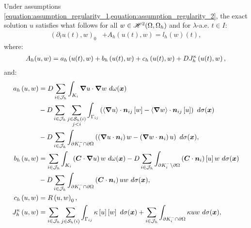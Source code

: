 Under assumptions \cref{equation:assumption_regularity_1,equation:assumption_regularity_2}, the exact solution $u$ satisfies what follows for all $w \in \mathscr{H}^{2}(\Omega, \Omega_h)$ and for $\lambda$-a.e. $t \in I$:
\begin{align}
    \left( \partial_t u(t), w \right)_0 &+ A_h(u(t), w) = l_h \left( w \right) (t),
\end{align}
where:
\begin{align}
    A_h(u, w) = a_h \left( u(t), w \right) + b_h \left( u(t), w \right) + c_h \left( u(t), w \right) + D J^{\kappa}_h \left( u(t), w \right) \label{equation:cdr_Ah},
\end{align}
and:
\begin{align}
    a_h \left( u, w \right) &= \Diffusion \sum_{i \in \SpaceIndices} \int_{K_i} \Gradient u \cdot \Gradient w ~ d \omega(\Vector{x}) \label{equation:cdr_ah} \\
    &- \Diffusion \sum_{i \in \SpaceIndices} \sum_{\substack{j \in \Neighbours{i} \\ j < i}} \int_{\Gamma_{ij}} \left( \left\langle \Gradient u \right\rangle \cdot \Vector{n}_{ij} \left[ w \right] - \left\langle \Gradient w \right\rangle \cdot \Vector{n}_{ij} \left[ u \right] \right) ~ d \sigma(\Vector{x}) \notag \\
    &- \Diffusion \sum_{i \in \SpaceIndices} \int_{\partial K_i^- \cap \partial \Omega} \left( \left( \Gradient u \cdot \Vector{n}_i \right) w - \left( \Gradient w \cdot \Vector{n}_i \right) u \right) ~ d \sigma(\Vector{x}), \notag \\
    b_h \left( u, w \right) &= \sum_{i \in \SpaceIndices} \int_{K_i} \left( \Convection \cdot \Gradient u \right) w ~ d \omega(\Vector{x}) \label{equation:cdr_bh} - \Diffusion \sum_{i \in \SpaceIndices} \int_{\partial K_i^- \setminus \partial \Omega} \left( \Convection \cdot \Vector{n}_i \right) \left[ u \right] w ~ d \sigma(\Vector{x}) \\
    &- \Diffusion \sum_{i \in \SpaceIndices} \int_{\partial K_i^- \cap \partial \Omega} \left( \Convection \cdot \Vector{n}_i \right) u w ~ d \sigma(\Vector{x}), \notag \\
    c_h \left( u, w \right) &= \Reaction \left( u, w \right)_0, \label{equation:cdr_ch} \\
    J^{\kappa}_h \left( u, w \right) &= \sum_{i \in \SpaceIndices} \sum_{j \in \Neighbours{i}} \int_{\Gamma_{ij}} \kappa \left[ u \right] \left[ w \right] ~ d \sigma(\Vector{x}) + \sum_{i \in \SpaceIndices} \int_{\partial K_i^- \cap \partial \Omega} \kappa u w ~ d \sigma(\Vector{x}), \label{equation:cdr_jh} \\

\end{align}

